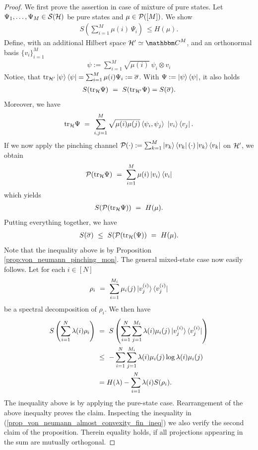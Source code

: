   \begin{proof}
  	We first prove the assertion in case of mixture of pure states. Let $\Psi_1, \dots, \Psi_M \in {\mathcal S}({\mathcal H})$ be pure states and $\mu \in {\mathcal P}([M])$. We show
  	 \begin{align}
		S\left(\sum_{i=1}^M \mu(i) \ \Psi_i\right) \ \leq  H(\mu).
	 \end{align}
	Define, with an additional Hilbert space $\cH' \simeq \bbmC^M$, and an orthonormal basis $\{v_i\}_{i=1}^M$
	\begin{align}
		\psi := \sum_{i=1}^M \sqrt{\mu(i)} \ \psi_i \otimes v_i
	\end{align}
	Notice, that $\mathrm{tr}_{{\mathcal H}'} \ket{\psi}\bra{\psi} = \sum_{i=1}^M \mu(i) \Psi_i := \overline{\sigma}$. With $\Psi := \ket{\psi}\bra{\psi}$, it also holds
	\begin{align}
	 S(\mathrm{tr}_{\mathcal H} \Psi) \ = \ S(\mathrm{tr}_{{\mathcal H}'}\Psi) = S(\overline{\sigma}).
	\end{align}
	Moreover, we have 
	\begin{align}
		\tr_{\cH} \Psi \ 
		= \ \sum_{i,j =1}^M \sqrt{\mu(i)\mu(j)} \braket{\psi_i, \psi_j} \ \ket{v_i}\bra{v_j}.
	\end{align}
	If we now apply the pinching channel ${\mathcal P}(\cdot) := \sum_{k=1}^M \ket{v_k}\bra{v_k}(\cdot)\ket{v_k}\bra{v_k}$ on ${\mathcal H}'$, we obtain
	\begin{align}
		 {\mathcal P}(\mathrm{tr}_{\mathcal H} \Psi) \ = \ \sum_{i=1}^M \mu(i) \ket{v_i}\bra{v_i}
	\end{align}
	which yields
	\begin{align}
		S({\mathcal P}(\mathrm{tr}_{\mathcal H} \Psi)) \ = \ H(\mu).
	\end{align}
	Putting everything together, we have
	\begin{align}
	 S(\overline{\sigma}) \ 
      \leq \ S(\cP(\tr_\cH(\Psi)) \
	 = \ H(\mu).  
	\end{align}
	Note that the inequality above is by Proposition \ref{prop:von_neumann_pinching_mon}.
	The general mixed-state case now easily follows. Let for each $i \in [N]$
	\begin{align}
		\rho_{i} \ = \ \sum_{i=1}^{M_i} \mu_i(j) \ket{v_j^{(i)}}\bra{v_j^{(i)}}
	\end{align} 
	be a spectral decomposition of $\rho_{i}$. We then have
	\begin{align}
	 S\left(\sum_{i=1}^N \lambda(i) \rho_i\right) \ 
	 &= \ S\left(\sum_{i=1}^N \sum_{j=1}^{M_i} \lambda(i) \mu_i(j) \ket{v_j^{(i)}} \bra{v_j^{(i)}}\right) \\
	 &\leq \ - \sum_{i=1}^N \sum_{j=1}^{M_i} \lambda(i) \mu_i(j) \log \lambda(i) \mu_i(j) \label{prop_von_neumann_almost_convexity_fin_ineq} \\
	 & = H(\lambda) - \sum_{i=1}^N \lambda(i) S(\rho_i).
	\end{align}
	The inequality above is by applying the pure-state case. Rearrangement of the above inequalty proves the claim. Inspecting the inequality in (\ref{prop_von_neumann_almost_convexity_fin_ineq}) we also verify the second claim of the proposition. Therein equality holds, if all projections appearing in the sum are mutually orthogonal. 
  \end{proof}
  
